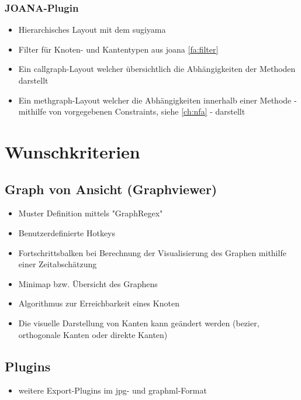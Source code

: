   \subsubsection{JOANA-Plugin}
    \begin{itemize}
      \item Hierarchisches Layout mit dem \gls{sugiyama}   
      \item Filter für Knoten- und Kantentypen aus \gls{joana} \ref{fa:filter}
      \item Ein \gls{callgraph}-Layout welcher übersichtlich die Abhängigkeiten der Methoden darstellt
      \item Ein \gls{methgraph}-Layout welcher die Abhängigkeiten innerhalb einer Methode - mithilfe von vorgegebenen Constraints, siehe \ref{ch:nfa} - darstellt 
    \end{itemize}
  

\section{Wunschkriterien}

\subsection{Graph von Ansicht (Graphviewer)}
  \begin{itemize}
    \item Muster Definition mittels "GraphRegex"
    \item Benutzerdefinierte Hotkeys
    \item Fortschrittsbalken bei Berechnung der Visualisierung des Graphen mithilfe einer Zeitabschätzung
    \item Minimap bzw. Übersicht des Graphens
    \item Algorithmus zur Erreichbarkeit eines Knoten
    \item Die visuelle Darstellung von Kanten kann geändert werden (\gls{bezier}, orthogonale Kanten oder direkte Kanten)
  \end{itemize}

\subsection{Plugins}
  \begin{itemize}
    \item weitere Export-Plugins im \gls{jpg}- und \gls{graphml}-Format
  \end{itemize}
  
